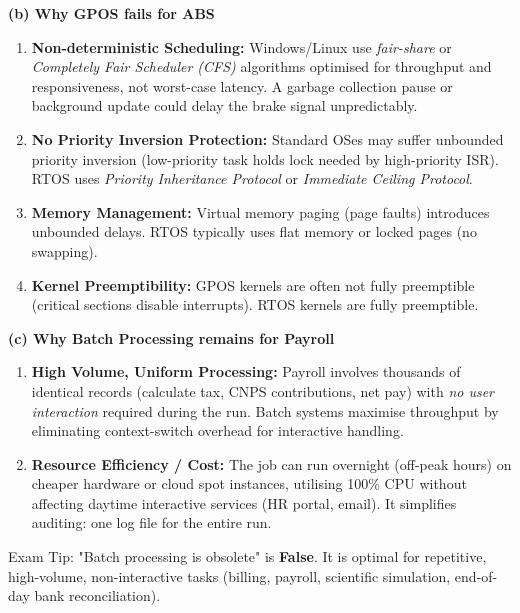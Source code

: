 \documentclass[11pt]{article}
\newcommand{\cle}[1]{{\popxbold\color{popdark}#1}}
\begin{document}
\begin{exoresolu}
\noindent\textbf{(b) Why GPOS fails for ABS}
\begin{enumerate}
    \item \textbf{Non-deterministic Scheduling:} Windows/Linux use \emph{fair-share} or \emph{Completely Fair Scheduler (CFS)} algorithms optimised for throughput and responsiveness, not worst-case latency. A garbage collection pause or background update could delay the brake signal unpredictably.
    \item \textbf{No Priority Inversion Protection:} Standard OSes may suffer unbounded priority inversion (low-priority task holds lock needed by high-priority ISR). RTOS uses \emph{Priority Inheritance Protocol} or \emph{Immediate Ceiling Protocol}.
    \item \textbf{Memory Management:} Virtual memory paging (page faults) introduces unbounded delays. RTOS typically uses flat memory or locked pages (no swapping).
    \item \textbf{Kernel Preemptibility:} GPOS kernels are often not fully preemptible (critical sections disable interrupts). RTOS kernels are fully preemptible.
\end{enumerate}

\noindent\textbf{(c) Why Batch Processing remains for Payroll}
\begin{enumerate}
    \item \textbf{High Volume, Uniform Processing:} Payroll involves thousands of identical records (calculate tax, CNPS contributions, net pay) with \emph{no user interaction} required during the run. Batch systems maximise throughput by eliminating context-switch overhead for interactive handling.
    \item \textbf{Resource Efficiency / Cost:} The job can run overnight (off-peak hours) on cheaper hardware or cloud spot instances, utilising 100\% CPU without affecting daytime interactive services (HR portal, email). It simplifies auditing: one log file for the entire run.
\end{enumerate}

\cle{Exam Tip:} "Batch processing is obsolete" is \textbf{False}. It is optimal for repetitive, high-volume, non-interactive tasks (billing, payroll, scientific simulation, end-of-day bank reconciliation).
\end{exoresolu}
\end{document}
